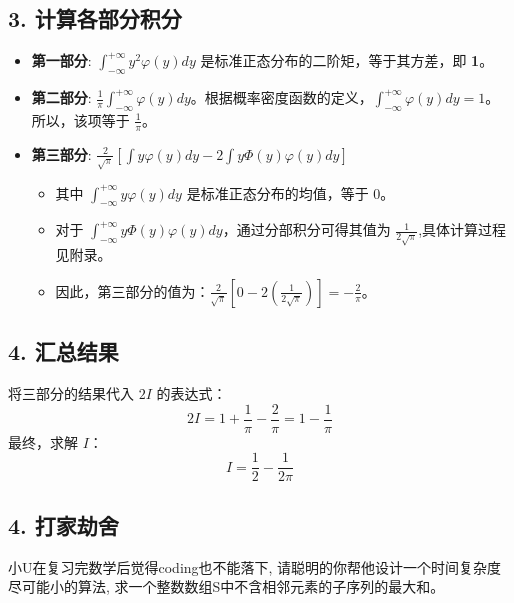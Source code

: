 \documentclass[UTF8]{ctexart}
\begin{document}
\subsection*{3. 计算各部分积分}
\begin{itemize}
    \item \textbf{第一部分}: $\int_{-\infty}^{+\infty} y^2 \varphi(y)dy$ 是标准正态分布的二阶矩，等于其方差，即 \textbf{1}。
    \item \textbf{第二部分}: $\frac{1}{\pi}\int_{-\infty}^{+\infty}\varphi(y)dy$。根据概率密度函数的定义，$\int_{-\infty}^{+\infty}\varphi(y)dy=1$。所以，该项等于 \textbf{$\frac{1}{\pi}$}。
    \item \textbf{第三部分}: $\frac{2}{\sqrt{\pi}} \left[ \int y\varphi(y)dy - 2\int y\Phi(y)\varphi(y)dy \right]$
        \begin{itemize}
            \item 其中 $\int_{-\infty}^{+\infty} y\varphi(y)dy$ 是标准正态分布的均值，等于 0。
            \item 对于 $\int_{-\infty}^{+\infty} y\Phi(y)\varphi(y)dy$，通过分部积分可得其值为 $\frac{1}{2\sqrt{\pi}}$,具体计算过程见附录。
    
            \item 因此，第三部分的值为：$\frac{2}{\sqrt{\pi}} \left[ 0 - 2 \left( \frac{1}{2\sqrt{\pi}} \right) \right] = -\frac{2}{\pi}$。
        \end{itemize}
\end{itemize}

\subsection*{4. 汇总结果}
将三部分的结果代入 $2I$ 的表达式：
$$ 2I = 1 + \frac{1}{\pi} - \frac{2}{\pi} = 1 - \frac{1}{\pi} $$
最终，求解 $I$：
$$ I = \frac{1}{2} - \frac{1}{2\pi} $$

\subsection*{4. 打家劫舍}
小U在复习完数学后觉得coding也不能落下, 请聪明的你帮他设计一个时间复杂度尽可能小的算法, 求一个整数数组S中不含相邻元素的子序列的最大和。
\end{document}
